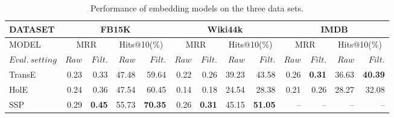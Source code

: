 \begin{table}[t]
\centering
\begin{tabular}{|l|r r|r r|r r|r r|r r|r r|} 
 \hline
 DATASET & \multicolumn{4}{|c|}{FB15K} & \multicolumn{4}{|c|}{Wiki44k} & \multicolumn{4}{|c|}{IMDB}\\
 \hline
 MODEL & \multicolumn{2}{|c|}{MRR}& \multicolumn{2}{|c|}{Hits@10(\%)} & \multicolumn{2}{|c|}{MRR}& \multicolumn{2}{|c|}{Hits@10(\%)} & \multicolumn{2}{|c|}{MRR}& \multicolumn{2}{|c|}{Hits@10(\%)} \\
 $Eval.\ setting$ & $Raw$ & $Filt.$ & $Raw$ & $Filt.$ & $Raw$ & $Filt.$ & $Raw$ & $Filt.$ & $Raw$ & $Filt.$ & $Raw$ & $Filt.$\\
 \hline
 TransE& 0.23 & 0.33 & 47.48 & 59.64 & 0.22 & 0.26 & 39.23 & 43.58 & 0.26 & \textbf{0.31} & 36.63 & \textbf{40.39}\\
 HolE & 0.24 & 0.36 & 47.54 & 60.45& 0.14 & 0.18 & 24.54 & 28.38  & 0.21 & 0.26 & 28.27 & 32.08 \\
 SSP & 0.29 & \textbf{0.45}& 55.73 & \textbf{70.35}& 0.26 & \textbf{0.31} & 45.15 & \textbf{51.05} & -- & -- & -- & -- \\
 \hline
\end{tabular}
\caption{Performance of embedding models on the three data sets.}
\label{table:embedding_performance}
\vspace*{-3mm}
\end{table}
